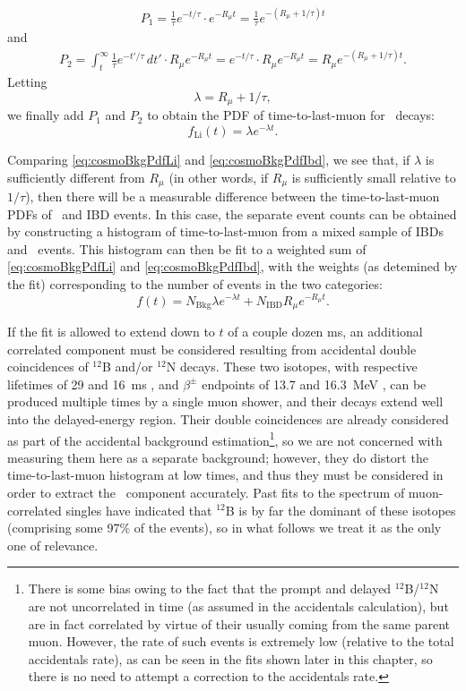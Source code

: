 \documentclass[../thesis.tex]{subfiles}
\begin{document}
\begin{align*}
  P_1 = \frac{1}{\tau} e^{-t/\tau} \cdot e^{-R_\mu t} = \frac{1}{\tau}e^{-(R_\mu + 1/\tau)t}
\end{align*}
and
\begin{align*}
  P_2 = \int_t^\infty \frac{1}{\tau}e^{-t'/\tau}\,dt' \cdot R_\mu e^{-R_\mu t} = e^{-t/\tau} \cdot R_\mu e^{-R_\mu t} = R_\mu e^{-(R_\mu + 1/\tau)t}.
\end{align*}
Letting
\begin{equation}
  \lambda = R_\mu + 1/\tau,
\end{equation}
we finally add $P_1$ and $P_2$ to obtain the PDF of time-to-last-muon for \linine\ decays:
\begin{equation}
  \label{eq:cosmoBkgPdfLi}
  f_{\mathrm{Li}}(t) = \lambda e^{-\lambda t}.
\end{equation}

Comparing \autoref{eq:cosmoBkgPdfLi} and \autoref{eq:cosmoBkgPdfIbd}, we see that, if $\lambda$ is sufficiently different from $R_\mu$ (in other words, if $R_\mu$ is sufficiently small relative to $1/\tau$), then there will be a measurable difference between the time-to-last-muon PDFs of \linine\ and IBD events. In this case, the separate event counts can be obtained by constructing a histogram of time-to-last-muon from a mixed sample of IBDs and \linine\ events. This histogram can then be fit to a weighted sum of \autoref{eq:cosmoBkgPdfLi} and \autoref{eq:cosmoBkgPdfIbd}, with the weights (as detemined by the fit) corresponding to the number of events in the two categories:
\begin{equation}
  f(t) = N_{\mathrm{Bkg}} \lambda e^{-\lambda t} + N_{\mathrm{IBD}} R_\mu e^{-R_\mu t}.
\end{equation}

If the fit is allowed to extend down to $t$ of a couple dozen ms, an additional correlated component must be considered resulting from accidental double coincidences of $^{12}$B and/or $^{12}$N decays. These two isotopes, with respective lifetimes of 29 and 16~ms \cite{ENDF}, and $\beta^\pm$ endpoints of 13.7 and 16.3~MeV \cite{ENDF}, can be produced multiple times by a single muon shower, and their decays extend well into the delayed-energy region. Their double coincidences are already considered as part of the accidental background estimation\footnote{There is some bias owing to the fact that the prompt and delayed $^{12}$B/$^{12}$N are not uncorrelated in time (as assumed in the accidentals calculation), but are in fact correlated by virtue of their usually coming from the same parent muon. However, the rate of such events is extremely low (relative to the total accidentals rate), as can be seen in the fits shown later in this chapter, so there is no need to attempt a correction to the accidentals rate.}, so we are not concerned with measuring them here as a separate background; however, they do distort the time-to-last-muon histogram at low times, and thus they must be considered in order to extract the \linine\ component accurately. Past fits \cite{NonlinearityPaper} to the spectrum of muon-correlated singles have indicated that $^{12}$B is by far the dominant of these isotopes (comprising some 97\% of the events), so in what follows we treat it as the only one of relevance.
\end{document}
